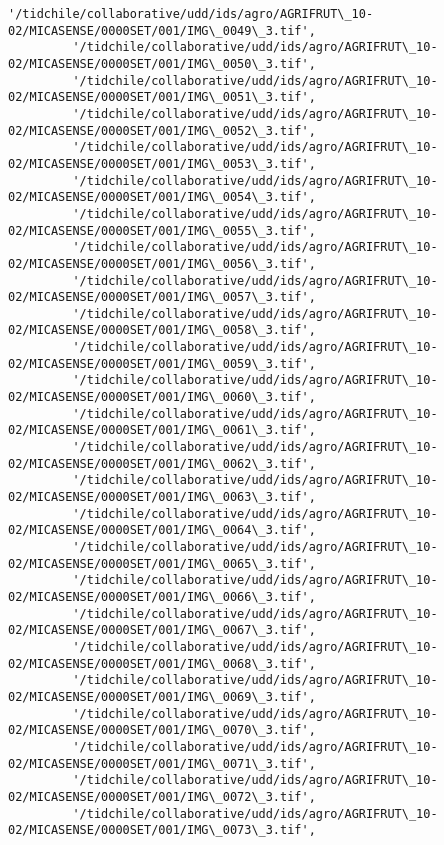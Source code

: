 \documentclass[11pt]{article}
\begin{document}
\begin{Verbatim}[commandchars=\\\{\}]
         '/tidchile/collaborative/udd/ids/agro/AGRIFRUT\_10-02/MICASENSE/0000SET/001/IMG\_0049\_3.tif',
         '/tidchile/collaborative/udd/ids/agro/AGRIFRUT\_10-02/MICASENSE/0000SET/001/IMG\_0050\_3.tif',
         '/tidchile/collaborative/udd/ids/agro/AGRIFRUT\_10-02/MICASENSE/0000SET/001/IMG\_0051\_3.tif',
         '/tidchile/collaborative/udd/ids/agro/AGRIFRUT\_10-02/MICASENSE/0000SET/001/IMG\_0052\_3.tif',
         '/tidchile/collaborative/udd/ids/agro/AGRIFRUT\_10-02/MICASENSE/0000SET/001/IMG\_0053\_3.tif',
         '/tidchile/collaborative/udd/ids/agro/AGRIFRUT\_10-02/MICASENSE/0000SET/001/IMG\_0054\_3.tif',
         '/tidchile/collaborative/udd/ids/agro/AGRIFRUT\_10-02/MICASENSE/0000SET/001/IMG\_0055\_3.tif',
         '/tidchile/collaborative/udd/ids/agro/AGRIFRUT\_10-02/MICASENSE/0000SET/001/IMG\_0056\_3.tif',
         '/tidchile/collaborative/udd/ids/agro/AGRIFRUT\_10-02/MICASENSE/0000SET/001/IMG\_0057\_3.tif',
         '/tidchile/collaborative/udd/ids/agro/AGRIFRUT\_10-02/MICASENSE/0000SET/001/IMG\_0058\_3.tif',
         '/tidchile/collaborative/udd/ids/agro/AGRIFRUT\_10-02/MICASENSE/0000SET/001/IMG\_0059\_3.tif',
         '/tidchile/collaborative/udd/ids/agro/AGRIFRUT\_10-02/MICASENSE/0000SET/001/IMG\_0060\_3.tif',
         '/tidchile/collaborative/udd/ids/agro/AGRIFRUT\_10-02/MICASENSE/0000SET/001/IMG\_0061\_3.tif',
         '/tidchile/collaborative/udd/ids/agro/AGRIFRUT\_10-02/MICASENSE/0000SET/001/IMG\_0062\_3.tif',
         '/tidchile/collaborative/udd/ids/agro/AGRIFRUT\_10-02/MICASENSE/0000SET/001/IMG\_0063\_3.tif',
         '/tidchile/collaborative/udd/ids/agro/AGRIFRUT\_10-02/MICASENSE/0000SET/001/IMG\_0064\_3.tif',
         '/tidchile/collaborative/udd/ids/agro/AGRIFRUT\_10-02/MICASENSE/0000SET/001/IMG\_0065\_3.tif',
         '/tidchile/collaborative/udd/ids/agro/AGRIFRUT\_10-02/MICASENSE/0000SET/001/IMG\_0066\_3.tif',
         '/tidchile/collaborative/udd/ids/agro/AGRIFRUT\_10-02/MICASENSE/0000SET/001/IMG\_0067\_3.tif',
         '/tidchile/collaborative/udd/ids/agro/AGRIFRUT\_10-02/MICASENSE/0000SET/001/IMG\_0068\_3.tif',
         '/tidchile/collaborative/udd/ids/agro/AGRIFRUT\_10-02/MICASENSE/0000SET/001/IMG\_0069\_3.tif',
         '/tidchile/collaborative/udd/ids/agro/AGRIFRUT\_10-02/MICASENSE/0000SET/001/IMG\_0070\_3.tif',
         '/tidchile/collaborative/udd/ids/agro/AGRIFRUT\_10-02/MICASENSE/0000SET/001/IMG\_0071\_3.tif',
         '/tidchile/collaborative/udd/ids/agro/AGRIFRUT\_10-02/MICASENSE/0000SET/001/IMG\_0072\_3.tif',
         '/tidchile/collaborative/udd/ids/agro/AGRIFRUT\_10-02/MICASENSE/0000SET/001/IMG\_0073\_3.tif',

\end{Verbatim}
\end{document}
